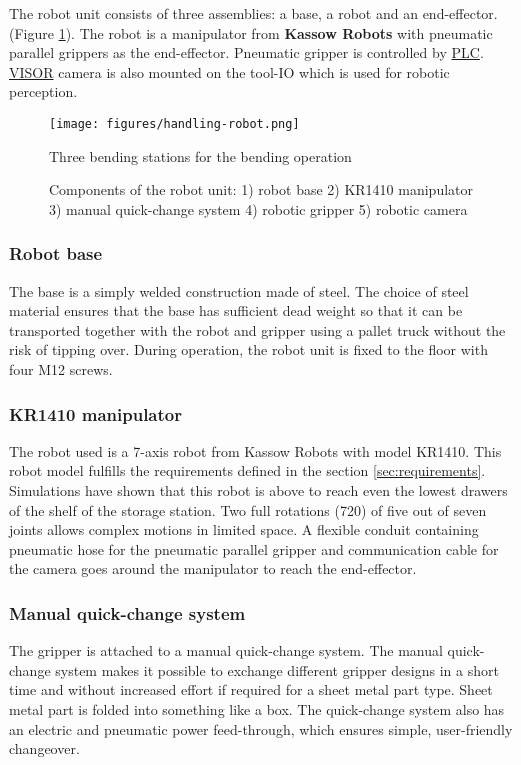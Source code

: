 The robot unit consists of three assemblies: a base, a robot and an end-effector. (Figure \ref{fig:robot-installation}).
The robot is a manipulator from \textbf{Kassow Robots} with pneumatic parallel grippers as the end-effector.
Pneumatic gripper is controlled by \hyperref[acro:PLC]{PLC}. \hyperref[acro:VISOR]{VISOR\textsuperscript{\textregistered}} camera is also mounted on the tool-IO which is used for robotic perception.


\begin{figure}[h]
    \centering
    \texttt{[image: figures/handling-robot.png]}
    \caption{Three bending stations for the bending operation}
    \caption{Components of the robot unit: 1) robot base 2) KR1410 manipulator 3) manual quick-change system 4) robotic gripper 5) robotic camera}
    \label{fig:robot-installation}
\end{figure}



\subsubsection{Robot base}
The base is a simply welded construction made of steel. The choice of steel material ensures that the base has
sufficient dead weight so that it can be transported together with the robot and gripper using a pallet
truck without the risk of tipping over. During operation, the robot unit is fixed to the floor with four M12
screws. 

\subsubsection{KR1410 manipulator}
The robot used is a 7-axis robot from Kassow Robots with model KR1410. This robot model fulfills the requirements defined in 
the section \ref{sec:requirements}. Simulations have shown that this robot is above to reach even the lowest drawers of the shelf of the
storage station. Two full rotations (720\textdegree) of five out of seven joints allows complex motions in limited space.
A flexible conduit containing pneumatic hose for the pneumatic parallel gripper and communication cable for the camera goes around the manipulator to reach the end-effector.



\subsubsection{Manual quick-change system}
The gripper is attached to a manual quick-change
system. The manual quick-change system makes it possible to exchange different gripper
designs in a short time and without increased effort if required for a sheet metal part type. Sheet metal
part is folded into something like a box. The quick-change system also has an electric and pneumatic power feed-through, which ensures simple,
user-friendly changeover.

